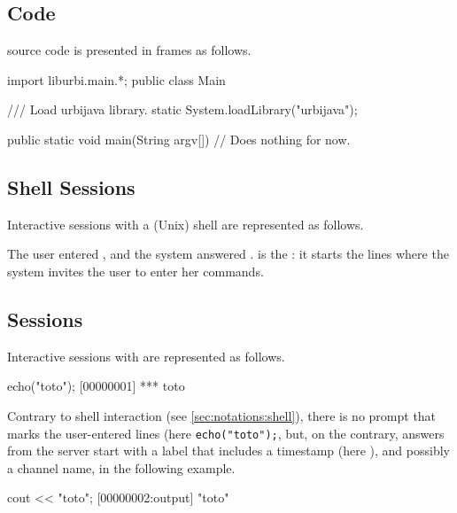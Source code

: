 \subsection{\Java Code}
\label{sec:notations:java}

\Java source code is presented in frames as follows.

\begin{java}
import liburbi.main.*;
public class Main
{
    /// Load urbijava library.
    static
    {
        System.loadLibrary("urbijava");
    }

    public static void main(String argv[])
    {
      // Does nothing for now.
    }
}
\end{java}

\subsection{Shell Sessions}
\label{sec:notations:shell}

Interactive sessions with a (Unix) shell are represented as follows.


The user entered , and the system answered .
\samp{\$} is the : it starts the lines where the system invites
the user to enter her commands.

\subsection{\us Sessions}
\label{sec:notations:us}

Interactive sessions with \urbi are represented as follows.

\begin{urbiscript}[firstnumber=1]
echo("toto");
[00000001] *** toto
\end{urbiscript}

Contrary to shell interaction (see \autoref{sec:notations:shell}), there is
no prompt that marks the user-entered lines (here \lstinline|echo("toto");|,
but, on the contrary, answers from the \urbi server start with a label that
includes a timestamp (here ), and possibly a channel name,
 in the following example.

\begin{urbiscript}
cout << "toto";
[00000002:output] "toto"
\end{urbiscript}


